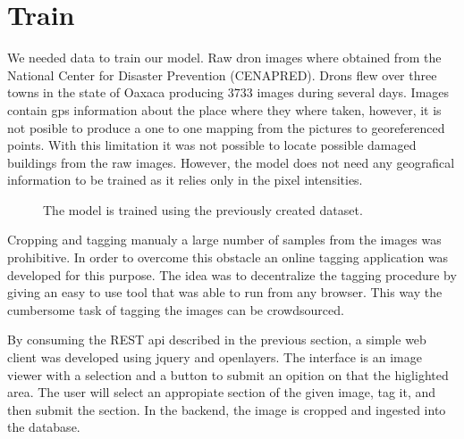 \section{Train}

We needed data to train our model. Raw dron images where obtained from the National Center for Disaster Prevention (CENAPRED). Drons flew over three towns in the state of Oaxaca producing $3733$ images during several days. Images contain gps information about the place where they where taken, however, it is not posible to produce a one to one mapping from the pictures to georeferenced points. With this limitation it was not possible to locate possible damaged buildings from the raw images. However, the model does not need any geografical information to be trained as it relies only in the pixel intensities.

\begin{figure}[h]
  \begin{center}
  \end{center}
  \label{fig:train}
  \caption{The model is trained using the previously created dataset.}
\end{figure}


Cropping and tagging manualy a large number of samples from the images was prohibitive. In order to overcome this obstacle an online tagging application was developed for this purpose. The idea was to decentralize the tagging procedure by giving an easy to use tool that was able to run from any browser. This way the cumbersome task of tagging the images can be crowdsourced.

By consuming the REST api described in the previous section, a simple web client was developed using jquery and openlayers. The interface is an image viewer with a selection and a button to submit an opition on that the higlighted area. The user will select an appropiate section of the given image, tag it, and then submit the section. In the backend, the image is cropped and ingested into the database.





